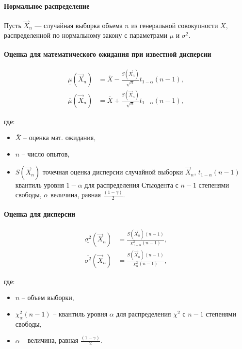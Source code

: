 \paragraph{Нормальное распределение}

Пусть $\vec{X}_{n}$ — случайная выборка объема $n$ из генеральной совокупности $X$, распределенной по нормальному закону с параметрами $\mu$ и $\sigma^{2}$.

\paragraph{Оценка для математического ожидания при известной дисперсии}

\begin{align}
\underline{\mu}(\vec{X}_{n}) &= \overline{X}-\frac{S(\vec{X}_{n})}{\sqrt{n}}t_{1-\alpha}(n-1),\\
\overline{\mu}(\vec{X}_{n}) &= \overline{X}+\frac{S(\vec{X}_{n})}{\sqrt{n}}t_{1-\alpha}(n-1),
\end{align}

\noindent где:
\begin{itemize}
	\item $\overline{X}$ -- оценка мат. ожидания,
	\item $n$ -- число опытов,
	\item $S(\vec{X}_{n})$ точечная оценка дисперсии случайной выборки $\vec{X}_{n}$, $t_{1-\alpha}(n-1)$ квантиль уровня $1-\alpha$ для распределения Стьюдента с $n-1$ степенями свободы, $\alpha$ величина, равная $\frac{(1-\gamma)}{2}$.
\end{itemize}

\paragraph{Оценка для дисперсии}


\begin{align}
\underline{\sigma^{2}}(\vec{X}_{n}) & =\frac{S(\vec{X}_{n})(n-1)}{\chi_{1-\alpha}^{2}(n-1)},\\
\overline{\sigma^{2}}(\vec{X}_{n}) & =\frac{S(\vec{X}_{n})(n-1)}{\chi_{\alpha}^{2}(n-1)},
\end{align}

\noindent где:
\begin{itemize}
	\item $n$ -- объем выборки,
	\item $\chi_{\alpha}^{2}(n-1)$ -- квантиль уровня $\alpha$ для распределения $\chi^{2}$ с $n-1$ степенями свободы,
	\item $\alpha$ -- величина, равная $\frac{(1-\gamma)}{2}$.
\end{itemize}
